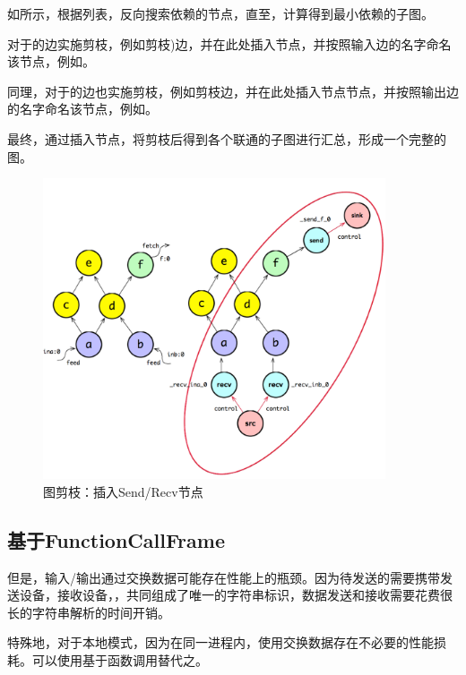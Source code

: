 \begin{content}
如所示，根据列表，反向搜索依赖的节点，直至，计算得到最小依赖的子图。

对于的边实施剪枝，例如剪枝)边，并在此处插入节点，并按照输入边的名字命名该节点，例如。

同理，对于的边也实施剪枝，例如剪枝边，并在此处插入节点节点，并按照输出边的名字命名该节点，例如。

最终，通过插入节点，将剪枝后得到各个联通的子图进行汇总，形成一个完整的图。

\begin{figure}[H]
\centering
\includegraphics[width=0.9\textwidth]{figures/client-prune-graph.png}
\caption{图剪枝：插入Send/Recv节点}
 \label{fig:client-prune-graph}
\end{figure}

\subsection{基于FunctionCallFrame}

但是，输入/输出通过交换数据可能存在性能上的瓶颈。因为待发送的需要携带发送设备，接收设备，，共同组成了唯一的字符串标识，数据发送和接收需要花费很长的字符串解析的时间开销。

特殊地，对于本地模式，因为在同一进程内，使用交换数据存在不必要的性能损耗。可以使用基于函数调用替代之。


\end{content}
